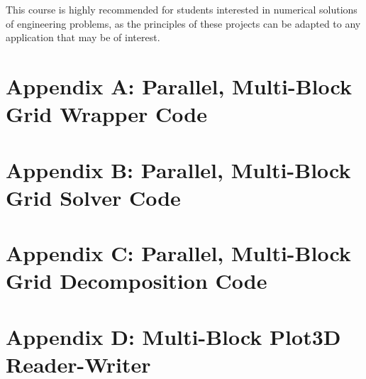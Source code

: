 \documentclass[twocolumn,10pt]{asme2ej}
\begin{document}
This course is highly recommended for students interested in numerical solutions of engineering problems, as the principles of these projects can be adapted to any application that may be of interest.









\onecolumn
\appendix       %

\section*{Appendix A: Parallel, Multi-Block Grid Wrapper Code}


\clearpage

\section*{Appendix B: Parallel, Multi-Block Grid Solver Code}


\section*{Appendix C: Parallel, Multi-Block Grid Decomposition Code}


\clearpage

\section*{Appendix D: Multi-Block Plot3D Reader-Writer}

\end{document}
